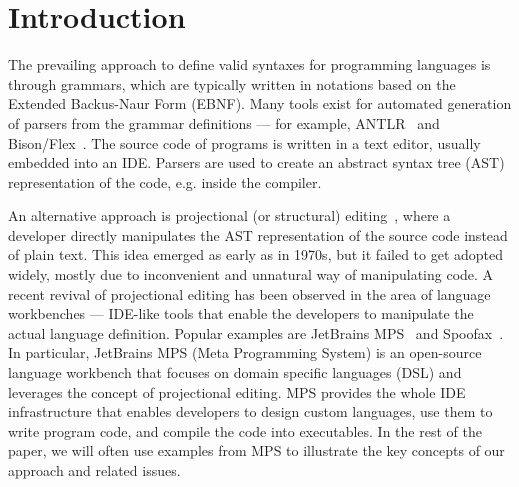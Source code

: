 \section{Introduction}

The prevailing approach to define valid syntaxes for programming languages is through grammars, which are typically written in notations based on the Extended Backus-Naur Form (EBNF).
Many tools exist for automated generation of parsers from the grammar definitions --- for example, ANTLR~\cite{ref:ANTLRBOOK,ref:ANTLR} and Bison/Flex~\cite{ref:BISONFLEX}.
The source code of programs is written in a text editor, usually embedded into an IDE. Parsers are used to create an abstract syntax tree (AST) representation of the code, e.g. inside the compiler.

An alternative approach is projectional (or structural) editing~\cite{ref:VWK15,ref:VSB14}, where a developer directly manipulates the AST representation of the source code instead of plain text.
This idea emerged as early as in 1970s, but it failed to get adopted widely, mostly due to inconvenient and unnatural way of manipulating code.
A recent revival of projectional editing has been observed in the area of language workbenches --- IDE-like tools that enable the developers to manipulate the actual language definition.
Popular examples are JetBrains MPS~\cite{ref:MPS,ref:MPSBOOK} and Spoofax~\cite{ref:KV10}.
In particular, JetBrains MPS (Meta Programming System) is an open-source language workbench that focuses on domain specific languages (DSL) and leverages the concept of projectional editing.
MPS provides the whole IDE infrastructure that enables developers to design custom languages, use them to write program code, and compile the code into executables.
In the rest of the paper, we will often use examples from MPS to illustrate the key concepts of our approach and related issues.


